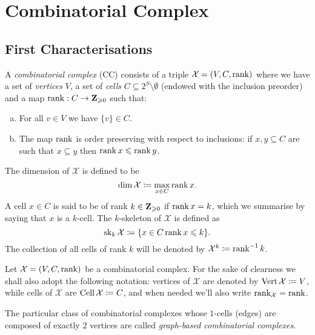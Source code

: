 \section{Combinatorial Complex}

\subsection{First Characterisations}

\begin{definition}
\label{def:combinatorial-complex}
A \emph{combinatorial complex} (CC) consists of a triple
\(\mathcal{X} = (V, C, \operatorname{rank})\) where we have a set of \emph{vertices} \(V\), a set of
\emph{cells} \(C \subseteq 2^S \setminus \emptyset\) (endowed with the inclusion preorder) and a map
\(\operatorname{rank}: C \to \mathbf{Z}_{\geqslant 0}\) such that:
\begin{enumerate}[(a)]\setlength\itemsep{0em}
\item For all \(v \in V\) we have \(\{v\} \in C\).
\item The map \(\operatorname{rank}\) is order preserving with respect to inclusions: if \(x,
  y \subseteq C\) are such that \(x \subseteq y\) then \(\operatorname{rank} x \leqslant \operatorname{rank} y\).
\end{enumerate}
The dimension of \(\mathcal{X}\) is defined to be
\[
\dim \mathcal{X} \coloneq \max_{x \in C} \operatorname{rank} x.
\]
A cell \(x \in C\) is said to be of rank \(k \in \mathbf{Z}_{\geqslant 0}\) if \(\operatorname{rank} x = k\), which we
summarise by saying that \(x\) is a \(k\)-cell. The \(k\)-skeleton of \(\mathcal{X}\) is
defined as
\[
\operatorname{sk}_k \mathcal{X} \coloneq \{x \in C \relax \operatorname{rank} x \leqslant k\}.
\]
The collection of all cells of rank \(k\) will be denoted by
\(\mathcal{X}^k \coloneq \operatorname{rank}^{-1} k\).
\end{definition}

\begin{notation}
\label{not:notation-combinatorial-complex}
Let \(\mathcal X = (V, C, \operatorname{rank})\) be a combinatorial complex. For the sake of
clearness we shall also adopt the following notation: vertices of
\(\mathcal{X}\) are denoted by \(\operatorname{Vert} \mathcal{X} \coloneq V\), while cells of
\(\mathcal{X}\) are \(\operatorname{Cell} \mathcal{X} \coloneq C\), and when needed we'll also write
\(\operatorname{rank}_{\mathcal{X}} = \operatorname{rank}\).
\end{notation}

\begin{example}
\label{exp:graph-based-cc}
The particular class of combinatorial complexes whose \(1\)-cells (edges) are
composed of exactly \(2\) vertices are called \emph{graph-based combinatorial
  complexes}.
\end{example}

